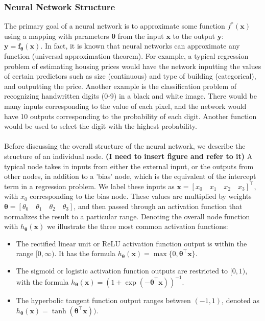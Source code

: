 \documentclass[a4paper,12pt]{article}
\numberwithin{equation}{section}
\begin{document}
\subsubsection{Neural Network Structure}
The primary goal of a neural network is to approximate some function $f^*(\textbf{x})$ using a mapping with parameters $\bm{\theta}$ from the input $\textbf{x}$ to the output $\textbf{y}$: $\textbf{y}=\textbf{f}_{\bm{\theta}}(\textbf{x})$. In fact, it is known that neural networks can approximate any function (universal approximation theorem). For example, a typical regression problem of estimating housing prices would have the network inputting the values of certain predictors such as size (continuous) and type of building (categorical), and outputting the price. Another example is the classification problem of recognizing handwritten digits (0-9) in a black and white image. There would be many inputs corresponding to the value of each pixel, and the network would have 10 outputs corresponding to the probability of each digit. Another function would be used to select the digit with the highest probability.\\
\\
Before discussing the overall structure of the neural network, we describe the structure of an individual node. \textbf{(I need to insert figure and refer to it) }A typical node takes in inputs from either the external input, or the outputs from other nodes, in addition to a 'bias' node, which is the equivalent of the intercept term in a regression problem. We label these inputs as $\textbf{x}=[x_0\quad x_1\quad x_2\quad x_3]^\top$, with $x_0$ corresponding to the bias node. These values are multiplied by weights $\bm{\theta}=[\theta_0\quad\theta_1\quad\theta_2\quad\theta_3]$, and then passed through an activation function that normalizes the result to a particular range. Denoting the overall node function with $h_{\bm{\theta}}(\textbf{x})$ we illustrate the three most common activation functions:
\begin{itemize}
\item The rectified linear unit or ReLU activation function output is within the range $[0,\infty)$. It has the formula $h_{\bm{\theta}}(\textbf{x})=\max\{0,\bm{\theta}^\top\textbf{x}\}$.
\item The sigmoid or logistic activation function outputs are restricted to $[0,1)$, with the formula $h_{\bm{\theta}}(\textbf{x})=(1+\exp(-\bm{\theta}^\top\textbf{x}))^{-1}$.
\item The hyperbolic tangent function output ranges between $(-1,1)$, denoted as $h_{\bm{\theta}}(\textbf{x})=\tanh(\bm{\theta}^\top\textbf{x}))$.
\end{itemize}
\end{document}
